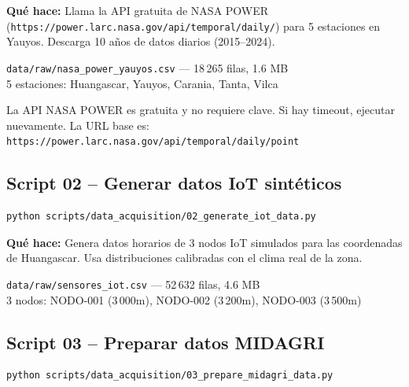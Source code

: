 \documentclass[11pt,a4paper]{article}
\begin{document}
\textbf{Qu\'e hace:} Llama la API gratuita de NASA POWER
(\texttt{https://power.larc.nasa.gov/api/temporal/daily/}) para 5 estaciones
en Yauyos. Descarga 10 a\~nos de datos diarios (2015--2024).

\begin{okbox}
\texttt{data/raw/nasa\_power\_yauyos.csv} --- 18\,265 filas, 1.6 MB\\
5 estaciones: Huangascar, Yauyos, Carania, Tanta, Vilca
\end{okbox}

\begin{alertbox}
La API NASA POWER es gratuita y no requiere clave. Si hay timeout, ejecutar
nuevamente. La URL base es:
\texttt{https://power.larc.nasa.gov/api/temporal/daily/point}
\end{alertbox}

\subsection{Script 02 -- Generar datos IoT sint\'eticos}

\begin{localbox}[]
\begin{lstlisting}[style=bash]
python scripts/data_acquisition/02_generate_iot_data.py
\end{lstlisting}
\end{localbox}

\textbf{Qu\'e hace:} Genera datos horarios de 3 nodos IoT simulados para
las coordenadas de Huangascar. Usa distribuciones calibradas con el clima
real de la zona.

\begin{okbox}[]
\texttt{data/raw/sensores\_iot.csv} --- 52\,632 filas, 4.6 MB\\
3 nodos: NODO-001 (3\,000m), NODO-002 (3\,200m), NODO-003 (3\,500m)
\end{okbox}

\subsection{Script 03 -- Preparar datos MIDAGRI}

\begin{localbox}[]
\begin{lstlisting}[style=bash]
python scripts/data_acquisition/03_prepare_midagri_data.py
\end{lstlisting}
\end{localbox}
\end{document}

